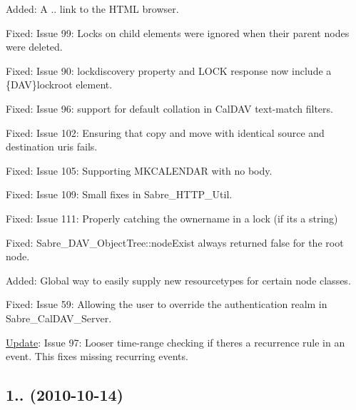 \begin{DoxyItemize}
\item Added\+: A \textquotesingle{}..\textquotesingle{} link to the H\+T\+ML browser.
\item Fixed\+: Issue 99\+: Locks on child elements were ignored when their parent nodes were deleted.
\item Fixed\+: Issue 90\+: lockdiscovery property and L\+O\+CK response now include a \{D\+AV\}lockroot element.
\item Fixed\+: Issue 96\+: support for \textquotesingle{}default\textquotesingle{} collation in Cal\+D\+AV text-\/match filters.
\item Fixed\+: Issue 102\+: Ensuring that copy and move with identical source and destination uri\textquotesingle{}s fails.
\item Fixed\+: Issue 105\+: Supporting M\+K\+C\+A\+L\+E\+N\+D\+AR with no body.
\item Fixed\+: Issue 109\+: Small fixes in Sabre\+\_\+\+H\+T\+T\+P\+\_\+\+Util.
\item Fixed\+: Issue 111\+: Properly catching the ownername in a lock (if it\textquotesingle{}s a string)
\item Fixed\+: Sabre\+\_\+\+D\+A\+V\+\_\+\+Object\+Tree\+::node\+Exist always returned false for the root node.
\item Added\+: Global way to easily supply new resourcetypes for certain node classes.
\item Fixed\+: Issue 59\+: Allowing the user to override the authentication realm in Sabre\+\_\+\+Cal\+D\+A\+V\+\_\+\+Server.
\item \mbox{\hyperlink{class_update}{Update}}\+: Issue 97\+: Looser time-\/range checking if there\textquotesingle{}s a recurrence rule in an event. This fixes \textquotesingle{}missing recurring events\textquotesingle{}.
\end{DoxyItemize}

\subsection*{1.. (2010-\/10-\/14) }


